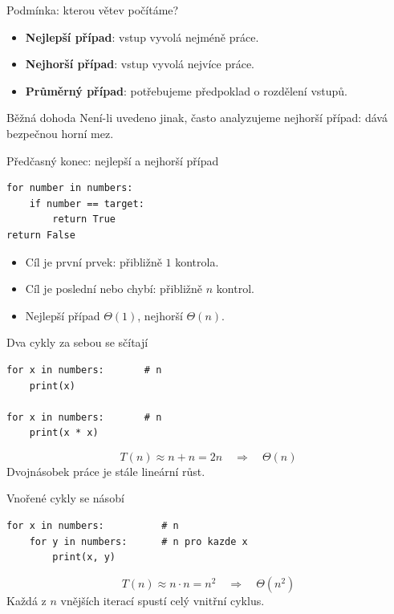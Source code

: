 \documentclass[aspectratio=169]{beamer}
\newcommand{\term}[1]{\textcolor{CodeBlue}{\textbf{#1}}}
\begin{document}
\begin{frame}{Podmínka: kterou větev počítáme?}
  \begin{itemize}
    \item \term{Nejlepší případ}: vstup vyvolá nejméně práce.
    \item \term{Nejhorší případ}: vstup vyvolá nejvíce práce.
    \item \term{Průměrný případ}: potřebujeme předpoklad o rozdělení vstupů.
  \end{itemize}
  \begin{block}{Běžná dohoda}
    Není-li uvedeno jinak, často analyzujeme nejhorší případ: dává bezpečnou horní mez.
  \end{block}
\end{frame}

\begin{frame}[fragile]{Předčasný konec: nejlepší a nejhorší případ}
\begin{lstlisting}[style=python]
for number in numbers:
    if number == target:
        return True
return False
\end{lstlisting}
  \begin{itemize}
    \item Cíl je první prvek: přibližně \(1\) kontrola.
    \item Cíl je poslední nebo chybí: přibližně \(n\) kontrol.
    \item Nejlepší případ \(\Theta(1)\), nejhorší \(\Theta(n)\).
  \end{itemize}
\end{frame}

\begin{frame}[fragile]{Dva cykly za sebou se sčítají}
\begin{lstlisting}[style=python]
for x in numbers:       # n
    print(x)

for x in numbers:       # n
    print(x * x)
\end{lstlisting}
  \[
    T(n) \approx n+n=2n \quad\Rightarrow\quad \Theta(n)
  \]
  Dvojnásobek práce je stále lineární růst.
\end{frame}

\begin{frame}[fragile]{Vnořené cykly se násobí}
\begin{lstlisting}[style=python]
for x in numbers:          # n
    for y in numbers:      # n pro kazde x
        print(x, y)
\end{lstlisting}
  \[
    T(n) \approx n\cdot n=n^2 \quad\Rightarrow\quad \Theta(n^2)
  \]
  Každá z \(n\) vnějších iterací spustí celý vnitřní cyklus.
\end{frame}
\end{document}
